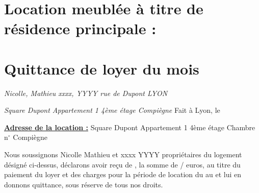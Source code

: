 \documentclass[a4paper,12pt]{article}
\begin{document}
\section*{\centering \Large Location meublée à titre de résidence principale :}
\section*{\centering \LARGE Quittance de loyer du mois  }


\begin{flushleft}
\textit{\linebreak Nicolle, Mathieu \linebreak
xxxx, YYYY  rue de Dupont  LYON}
\end{flushleft}

\begin{flushright}
\textit{
  Square Dupont \linebreak
Appartement 1 4ème étage  Compiègne} \linebreak
\linebreak
Fait à Lyon, le 
\end{flushright}


\begin{flushleft}
\underline{\textbf{Adresse de la location :}} Square Dupont \linebreak
Appartement 1 4ème étage \linebreak
Chambre n$^\circ$ Compiègne
\end{flushleft}

Nous soussignons Nicolle Mathieu et xxxx YYYY propriétaires du logement désigné ci-dessus, déclarons avoir reçu de , la somme de  /  euros, au titre du paiement du loyer et des charges pour la période de location du  au  et lui en donnons quittance, sous réserve de tous nos droits.
\end{document}
